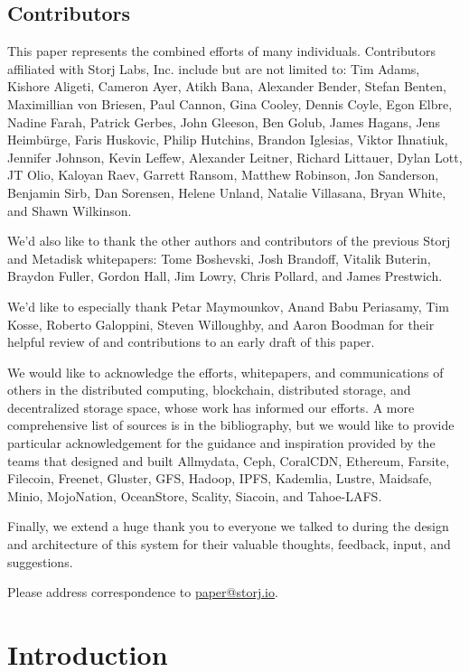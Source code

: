 \documentclass[8pt,fleqn,openany]{book}
\begin{document}
\section{Contributors}

This paper represents the combined efforts of many individuals.
Contributors affiliated with Storj Labs, Inc. include but are not limited to:
Tim Adams,
Kishore Aligeti,
Cameron Ayer,
Atikh Bana,
Alexander Bender,
Stefan Benten,
Maximillian von Briesen,
Paul Cannon,
Gina Cooley,
Dennis Coyle,
Egon Elbre,
Nadine Farah,
Patrick Gerbes,
John Gleeson,
Ben Golub,
James Hagans,
Jens Heimbürge,
Faris Huskovic,
Philip Hutchins,
Brandon Iglesias,
Viktor Ihnatiuk,
Jennifer Johnson,
Kevin Leffew,
Alexander Leitner,
Richard Littauer,
Dylan Lott,
JT Olio,
Kaloyan Raev,
Garrett Ransom,
Matthew Robinson,
Jon Sanderson,
Benjamin Sirb,
Dan Sorensen,
Helene Unland,
Natalie Villasana,
Bryan White,
and Shawn Wilkinson.

We'd also like to thank the other authors and contributors of the
previous Storj and Metadisk whitepapers:
Tome Boshevski,
Josh Brandoff,
Vitalik Buterin,
Braydon Fuller,
Gordon Hall,
Jim Lowry,
Chris Pollard,
and James Prestwich.

We'd like to especially thank
Petar Maymounkov,
Anand Babu Periasamy,
Tim Kosse,
Roberto Galoppini,
Steven Willoughby,
and Aaron Boodman
for their helpful review of and contributions to an early draft of this paper.

We would like to acknowledge the efforts, whitepapers, and communications of
others in the distributed computing, blockchain, distributed storage, and
decentralized storage space, whose work has informed our efforts. A more
comprehensive list of sources is in the bibliography, but we would like to
provide particular acknowledgement for the guidance and inspiration provided
by the teams that designed and built
Allmydata,
Ceph,
CoralCDN,
Ethereum,
Farsite,
Filecoin,
Freenet,
Gluster,
GFS,
Hadoop,
IPFS,
Kademlia,
Lustre,
Maidsafe,
Minio,
MojoNation,
OceanStore,
Scality,
Siacoin,
and Tahoe-LAFS.

Finally, we extend a huge thank you to everyone we talked to during the
design and architecture of this system for their valuable thoughts, feedback,
input, and suggestions.

Please address correspondence to \href{mailto:paper@storj.io}{paper@storj.io}.

\chapter{Introduction}\label{chap:intro}
\end{document}
